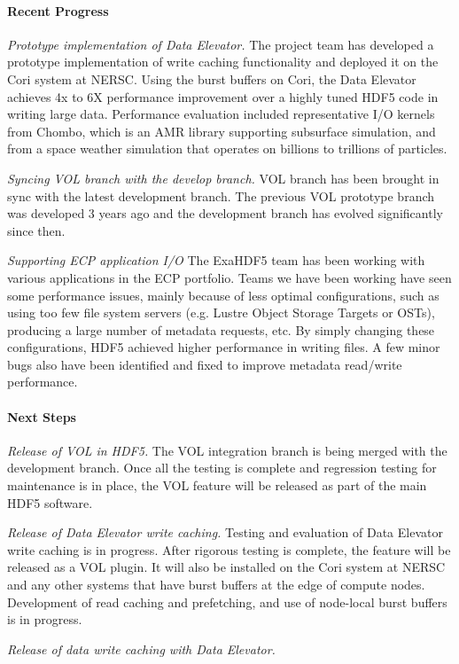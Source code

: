 \paragraph{Recent Progress}
\emph{Prototype implementation of Data Elevator.} The project team has developed a prototype implementation of write caching functionality and deployed it on the Cori system at NERSC. Using the burst buffers on Cori, the Data Elevator achieves 4x to 6X performance improvement over a highly tuned HDF5 code in writing large data. Performance evaluation included representative I/O kernels from Chombo, which is an AMR library supporting subsurface simulation, and from a space weather simulation that operates on billions to trillions of particles. 

\emph{Syncing VOL branch with the develop branch. } VOL branch has been brought in sync with the latest development branch. The previous VOL prototype branch was developed 3 years ago and the development branch has evolved significantly since then. 

\emph{Supporting ECP application I/O}
The ExaHDF5 team has been working with various applications in the ECP portfolio. Teams we have been working have seen some performance issues, mainly because of less optimal configurations, such as using too few file system servers (e.g. Lustre Object Storage Targets or OSTs), producing a large number of metadata requests, etc. By simply changing these configurations, HDF5  achieved higher performance in writing files. A few minor bugs also have been identified and fixed to improve metadata read/write performance.

\paragraph{Next Steps}

\emph{Release of VOL in HDF5.} The VOL integration branch is being merged with the development branch. Once all the testing is complete and regression testing for maintenance is in place, the VOL feature will be released as part of the main HDF5 software. 

\emph{Release of Data Elevator write caching.} Testing and evaluation of Data Elevator write caching is in progress. After rigorous testing is complete, the feature will be released as a VOL plugin. It will also be installed on the Cori system at NERSC and any other systems that have burst buffers at the edge of compute nodes. Development of read caching and prefetching, and use of node-local burst buffers is in progress. 

\emph{Release of data write caching with Data Elevator.}